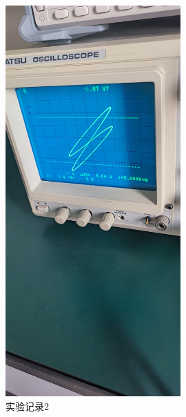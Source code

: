 \documentclass{ctexart}
\begin{document}
\begin{figure}[H]
  \centering
  \includegraphics[width=0.6\textwidth,height=0.3\textheight]{shiyanjilu2.jpg}
  \caption{实验记录2}
\end{figure}
\end{document}
